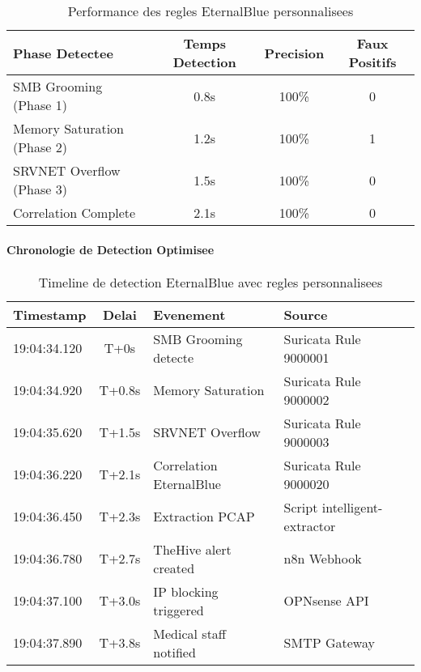 \begin{table}[H]
    \centering
    \caption{Performance des regles EternalBlue personnalisees}
    \begin{tabular}{|l|c|c|c|}
        \hline
        \textbf{Phase Detectee}     & \textbf{Temps Detection} & \textbf{Precision} & \textbf{Faux Positifs} \\
        \hline
        SMB Grooming (Phase 1)      & 0.8s                     & 100\%              & 0                      \\
        \hline
        Memory Saturation (Phase 2) & 1.2s                     & 100\%              & 1                      \\
        \hline
        SRVNET Overflow (Phase 3)   & 1.5s                     & 100\%              & 0                      \\
        \hline
        Correlation Complete        & 2.1s                     & 100\%              & 0                      \\
        \hline
    \end{tabular}
\end{table}

\paragraph{Chronologie de Detection Optimisee}

\begin{table}[H]
    \centering
    \caption{Timeline de detection EternalBlue avec regles personnalisees}
    \begin{tabular}{|l|c|l|l|}
        \hline
        \textbf{Timestamp} & \textbf{Delai} & \textbf{Evenement}      & \textbf{Source}              \\
        \hline
        19:04:34.120       & T+0s           & SMB Grooming detecte    & Suricata Rule 9000001        \\
        \hline
        19:04:34.920       & T+0.8s         & Memory Saturation       & Suricata Rule 9000002        \\
        \hline
        19:04:35.620       & T+1.5s         & SRVNET Overflow         & Suricata Rule 9000003        \\
        \hline
        19:04:36.220       & T+2.1s         & Correlation EternalBlue & Suricata Rule 9000020        \\
        \hline
        19:04:36.450       & T+2.3s         & Extraction PCAP         & Script intelligent-extractor \\
        \hline
        19:04:36.780       & T+2.7s         & TheHive alert created   & n8n Webhook                  \\
        \hline
        19:04:37.100       & T+3.0s         & IP blocking triggered   & OPNsense API                 \\
        \hline
        19:04:37.890       & T+3.8s         & Medical staff notified  & SMTP Gateway                 \\
        \hline
    \end{tabular}
\end{table}


